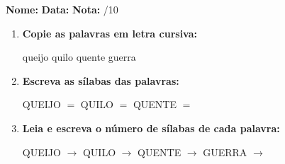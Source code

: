 \begin{exercicio}



\noindent\textbf{Nome:} \underline{\hspace{3.2cm}} \quad \textbf{Data:} \underline{\hspace{1.6cm}} \quad \textbf{Nota:} \underline{\hspace{0.9cm}}/10


\begin{enumerate}

  \item \textbf{Copie as palavras em letra cursiva:}
  \begin{center}
  queijo \quad quilo \quad quente \quad guerra
  \end{center}
  \begin{center}
  \underline{\hspace{2.4cm}} \quad \underline{\hspace{2.4cm}} \quad \underline{\hspace{2.4cm}} \quad \underline{\hspace{2.4cm}}
  \end{center}

  \item \textbf{Escreva as sílabas das palavras:}
  \begin{center}
  QUEIJO $=$ \underline{\hspace{1.5cm}} \underline{\hspace{1.5cm}} \quad QUILO $=$ \underline{\hspace{1.5cm}} \underline{\hspace{1.5cm}} \quad QUENTE $=$ \underline{\hspace{1.5cm}} \underline{\hspace{1.5cm}}
  \end{center}

  \item \textbf{Leia e escreva o número de sílabas de cada palavra:}
  \begin{center}
  QUEIJO $\rightarrow$ \underline{\hspace{0.9cm}} \quad QUILO $\rightarrow$ \underline{\hspace{0.9cm}} \quad QUENTE $\rightarrow$ \underline{\hspace{0.9cm}} \quad GUERRA $\rightarrow$ \underline{\hspace{0.9cm}}
  \end{center}


\end{enumerate}
\end{exercicio}

